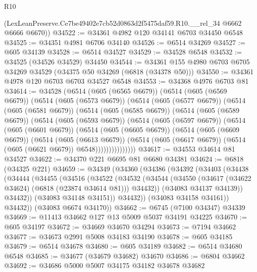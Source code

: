 \begin{lexlean}{R10}
\begin{coremodule}
      (LexLeanPreserve.Ce7be49402e7cb52d0863d2f5475daf59.R10.__rel_34 @6662 @6666 @6670))
@34522 := @34361 @4982 @120 @34141 @6703 @34450 @6548
@34525 := @34351 @4981 @6706 @34140
@34526 := @6514 @34269
@34527 := @605 @34139
@34528 := @6514 @34527
@34529 := @34528 @6548
@34532 := @34525 (@34526 @34529) @34450
@34544 := @34361 @155 @4980 @6703 @6705 @34269 @34529 (@34375 @50 @34269 (@6818 (@34378 @50)))
@34550 := @34361 @4978 @120 @6703 @6703 @34527 @6548
@34553 := @34368 @4976 @6703 @81
@34614 := @34528
    (@6514
      (@605 (@6565 @6679))
      (@6514
        (@605 (@6569 @6679))
        (@6514
          (@605 (@6573 @6679))
          (@6514
            (@605 (@6577 @6679))
            (@6514
              (@605 (@6581 @6679))
              (@6514
                (@605 (@6585 @6679))
                (@6514
                  (@605 (@6589 @6679))
                  (@6514
                    (@605 (@6593 @6679))
                    (@6514
                      (@605 (@6597 @6679))
                      (@6514
                        (@605 (@6601 @6679))
                        (@6514
                          (@605 (@6605 @6679))
                          (@6514
                            (@605 (@6609 @6679))
                            (@6514
                              (@605 (@6613 @6679))
                              (@6514
                                (@605 (@6617 @6679))
                                (@6514 (@605 (@6621 @6679)) @6548)))))))))))))))
@34617 := @34553 @34614 @81 @34527
@34622 := @34370 @221 @6695 @81 @6680 @34381
@34624 := @6818 (@34325 @221)
@34659 := @34349
    (@34360
      (@34386
        (@34392
          (@34403
            (@34438
              (@34444
                (@34455
                  (@34516
                    (@34522
                      (@34532
                        (@34544
                          (@34550 (@34617 (@34622 @34624) (@6818 (@23874 @34614 @81))) @34432))
                        (@34083 @34137 @34139))
                      @34432))
                  (@34083 @34148 @34151))
                @34432))
            (@34083 @34158 @34161))
          @34432))
      (@34083 @6674 @34170))
@34662 := @6745 (@7100 @34347) @34339
@34669 := @11413 @34662 @127 @13 @5009 @5037 @34191 @34225
@34670 := @605 @34197
@34672 := @34669 @34670 @34294
@34673 := @7194 @34662
@34677 := @34673 @2991 @5008 @34183 @34190
@34678 := @605 @34185
@34679 := @6514 @34678
@34680 := @605 @34189
@34682 := @6514 @34680 @6548
@34685 := @34677 (@34679 @34682) @34670
@34686 := @6804 @34662
@34692 := @34686 @5000 @5007 @34175 @34182 @34678 @34682

\end{coremodule}
\end{lexlean}
